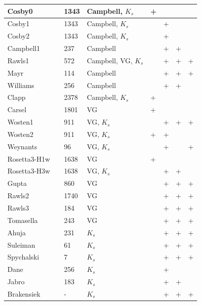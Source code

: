 \begin{landscape}
\begin{ThreePartTable}
\begin{center}
\begin{longtable}{p{2cm}<{\centering}p{4cm}<{\centering}p{2cm}<{\centering}p{2.8cm}<{\centering}p{2cm}<{\centering}p{2cm}<{\centering}p{2cm}<{\centering}p{2cm}<{\centering}}
Cosby0& \citet{cosby1984statistical} &	1343&	Campbell, $K_s$&  + & & & \\ \hline
Cosby1&	\citet{cosby1984statistical} &	1343&	Campbell, $K_s$&	&	+&	&	\\\hline
Cosby2&	\citet{cosby1984statistical} &	1343&	Campbell, $K_s$&	&	+&	&	\\\hline
Campbell1& \citet{campbell_Shiozawa_1992} &	237&	Campbell&	&	+&	+&	\\\hline
Rawls1&	\citet{Rawls_Brakensiek_1989} &	572&	Campbell, VG, $K_s$&	&	+&	+&	+\\\hline
Mayr& \citet{Mayr_Jarvis_1999} &	114&	Campbell&	&	+&	+&	+\\\hline
Williams& \citet{Williams_Ross_1992} &	256&	Campbell&	&	+&	+&	\\\hline
Clapp& \citet{clapp1978empirical} &	2378&	Campbell, $K_s$&  +	& & & \\\hline
Carsel&	\citet{Carsel_Parrish_1988} &	1801&	VG&	+&	&	&	\\\hline
Wosten1& \citet{Wösten_Lilly_1999} &	911&	VG, $K_s$&	&	+&	+&	+\\\hline
Wosten2& \citet{Wösten_Lilly_1999} &	911&	VG, $K_s$&	+&	+&	&	\\\hline
Weynants& \citet{Weynants_Vereecken_2009} &	96&	VG, $K_s$&	&	+&	&	+\\\hline
Rosetta3-H1w& \citet{Zhang_Schaap_2017} &	1638&	VG&	+&	&	&	\\\hline
Rosetta3-H3w& \citet{Zhang_Schaap_2017} &	1638&	VG, $K_s$&	&	+&	+&	\\\hline
Gupta& \citet{Gupta_Larson_1979} &	860&	VG&	&	+&	+&	+\\\hline
Rawls2&	\citet{Rawls_Brakensiek_1982} &	1740&	VG&	&	+&	+&	+\\\hline
Rawls3&	\citet{Rawls_Brakensiek_1983} &	184&	VG&	&	+&	+&	+\\\hline
Tomasella& \citet{Tomasella_Hodnett_1998}&	243&	VG&	&	+&	+&	+\\\hline
Ahuja& \citet{Ahuja_1989} &	231&	$K_s$&	&	+&	+&	+\\\hline
Suleiman& \citet{Suleiman_2001}&	61&	$K_s$&	&	+&	+&	+\\\hline
Spychalski&	\citet{Spychalski_2007} &	7&	$K_s$&	&	+&	+&	+\\\hline
Dane& \citet{Dane_Puckett_1994} &	256&	$K_s$&	&	+&	&	\\\hline
Jabro& \citet{Jabro_1992} &	183&	$K_s$&	&	+&	+&	\\\hline
Brakensiek& \citet{Brakensiek_1984} &	-&	$K_s$&	&	+&	+&	+\\\hline

\end{longtable}
\end{center}
\end{ThreePartTable}
\end{landscape}
